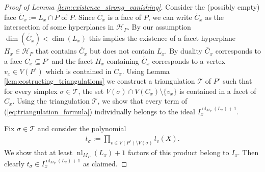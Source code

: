 \documentclass[a4paper,10pt]{amsart}
\theoremstyle{definition}
\theoremstyle{plain}
\newcommand{\nl}{\operatorname{nl}}
\newcommand{\cH}{{\mathcal H}}
\newcommand{\cT}{{\mathcal T}}
\begin{document}
\begin{proof}[Proof of Lemma \ref{lem:existence_strong_vanishing}]
Consider the (possibly empty) face $\widetilde{C_x}:=L_x\cap P$ of $P$. Since $\widetilde{C_x}$ is a face of $P$, we can write $\widetilde{C_x}$ as the intersection of some hyperplanes in $\cH_P$. By our assumption $\dim(\widetilde{C_x})<\dim(L_x)$ this implies the existence of a facet hyperplane $H_x\in \cH_P$ that contains $\widetilde{C_x}$ but does not contain $L_x$. By duality $\widetilde{C_x}$ corresponds to a face $C_x \subseteq P^\circ$ and the facet $H_x$ containing $\widetilde{C_x}$ corresponds to a vertex $v_x\in V(P^\circ)$ which is contained in $C_x$. Using Lemma \ref{lem:costructing_triangulations} we construct a triangulation $\cT$ of $P^\circ$ such that for every simplex $\sigma\in \cT$, the set $V(\sigma)\cap V(C_x)\setminus \{v_x\}$ is contained in a facet of $C_x$. Using the triangulation $\cT$, we show that every term of (\ref{eq:triangulation_formula}) individually belongs to the ideal $I_x^{\nl_{M_P}(L_x)+1}$. 

Fix $\sigma \in \cT$ and consider the polynomial \begin{align*}
        t_\sigma:=\prod_{v\in V(P^\circ)\setminus V(\sigma)}l_v(X).
    \end{align*}
    We show that at least $\nl_{M_P}(L_x)+1$ factors of this product belong to $I_x$. Then clearly $t_\sigma\in I_x^{\nl_{M_P}(L_x)+1}$ as claimed.


\end{proof}
\end{document}
